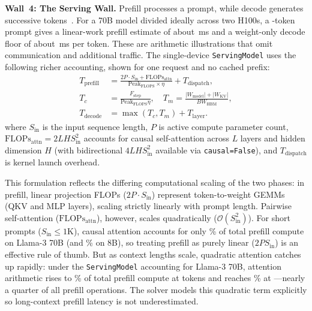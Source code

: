\documentclass[10pt,twocolumn]{article}
\newcommand{\cvalint}[1]{\pgfmathprintnumber[fixed, precision=0, 1000 sep={\,}]{#1}}
\begin{document}
\textbf{Wall~4: The Serving Wall.} Prefill processes a prompt, while decode generates successive tokens~\citep{pope2023llm}. For a 70B model divided ideally across two H100s, a \cvalint{\ServSin}-token prompt gives a linear-work prefill estimate of about \cvalint{\ServPrefillMs}\,ms and a weight-only decode floor of about \cvalint{\ServDecodeMs}\,ms per token. These are arithmetic illustrations that omit communication and additional traffic. The single-device \texttt{ServingModel} uses the following richer accounting, shown for one request and no cached prefix:
\begin{align}
\label{eq:serving}
T_{\text{prefill}} &= \frac{2P \cdot S_{\text{in}} + \text{FLOPs}_{\text{attn}}}{\text{Peak}_{\text{FLOPS}} \times \eta} + T_{\text{dispatch}}, \\
T_c &= \frac{F_{\text{step}}}{\text{Peak}_{\text{FLOPS}}\eta}, \quad
T_m = \frac{|W_{\text{model}}|+|W_{\text{KV}}|}{BW_{\text{HBM}}}, \\
T_{\text{decode}} &= \max(T_c,T_m)+T_{\text{layer}}.
\end{align}
where $S_{\text{in}}$ is the input sequence length, $P$ is active compute parameter count, $\text{FLOPs}_{\text{attn}} = 2 L H S_{\text{in}}^2$ accounts for causal self-attention across $L$ layers and hidden dimension $H$ (with bidirectional $4 L H S_{\text{in}}^2$ available via \texttt{causal=False}), and $T_{\text{dispatch}}$ is kernel launch overhead.

This formulation reflects the differing computational scaling of the two phases: in prefill, linear projection FLOPs ($2P \cdot S_{\text{in}}$) represent token-to-weight GEMMs (QKV and MLP layers), scaling strictly linearly with prompt length. Pairwise self-attention ($\text{FLOPs}_{\text{attn}}$), however, scales quadratically ($\mathcal{O}(S_{\text{in}}^2)$). For short prompts ($S_{\text{in}} \le 1\text{K}$), causal attention accounts for only \WallFourAttnShareOneKSeventyBPct\% of total prefill compute on Llama-3 70B (and \WallFourAttnShareOneKEightBPct\% on 8B), so treating prefill as purely linear ($2PS_{\text{in}}$) is an effective rule of thumb. But as context lengths scale, quadratic attention catches up rapidly: under the \texttt{ServingModel} accounting for Llama-3 70B, attention arithmetic rises to \WallFourAttnShareEightKPct\% of total prefill compute at \WallFourAttnSeqShort{} tokens and reaches \WallFourAttnShareThirtyTwoKPct\% at \WallFourAttnSeqLong{}---nearly a quarter of all prefill operations. The solver models this quadratic term explicitly so long-context prefill latency is not underestimated.
\end{document}
